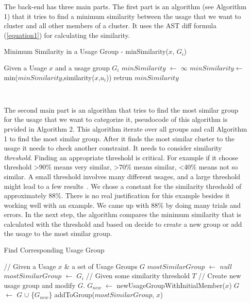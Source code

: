 \documentclass[conference]{IEEEtran}
\begin{document}
The back-end has three main parts. The first part is an algorithm (see Algorithm 1) that it tries to find a minimum similarity between the usage that we want to cluster and all other members of a cluster. It uses the AST diff formula (\ref{equation1}) for calculating the similarity.\par

\begin{algorithm}
\label{algo1}
    \caption{Minimum Similarity in a Usage Group - minSimilarity($x$, $G_{i}$)} 
    \begin{algorithmic}[1]
    \State Given a Usage $x$ and a usage group $G_{i}$
    \State $minSimilarity$ $\leftarrow$ $\infty$
    \State $minSimilarity$$\leftarrow$min($minSimilarity$,similarity($x$,$u_{i}$)) \EndFor
   \State retrun $minSimilarity$
    \end{algorithmic} 
     \
\end{algorithm}

The second main part is an algorithm that tries to find the most similar group for the usage that we want to categorize it, pseudocode of this algorithm is prvided in Algorithm 2. This algorithm iterate over all groups and call Algorithm 1 to find the most similar group. After it finds the most similar cluster to the usage it needs to check another constraint. It needs to consider similarity \textit{threshold}. Finding an appropriate threshold is critical. For example if it choose threshold \textgreater 90\% means very similar, \textgreater 70\% means similar, \textless 40\% means not so similar. A small threshold involves many different usages, and a large threshold might lead to a few results~\cite{deng2013top}. We chose a constant for the similarity threshold of approximately 88\%. There is no real justification for this example besides it working well with an example. We came up with 88\% by doing many trials and errors. In the next step, the algorithm compares the minimum similarity that is calculated with the threshold and based on decide to create a new group or add the usage to the most similar group. 

\begin{algorithm}
\label{algo2}
    \caption{Find Corresponding Usage Group} 
    \begin{algorithmic}[1]
    \State // Given a Usage $x$ \& a set of Usage Groups $G$
    \State $mostSimilarGroup$ $\leftarrow$ $null$
    \State $mostSimilarGroup$ $\leftarrow$ $G_{i}$
    \EndIf
    \EndFor
    \State // Given some similarity threshold $T$
        \State // Create new usage group and modify $G$.
        \State $G_{new}$ $\leftarrow$ newUsageGroupWithInitialMember($x$)
        \State $G$ $\leftarrow$ $G$ $\cup$ \{$G_{new}$\}
    \Else
    \State addToGroup($mostSimilarGroup$, $x$)
    \EndIf
    \end{algorithmic} 
\end{algorithm}
\end{document}
